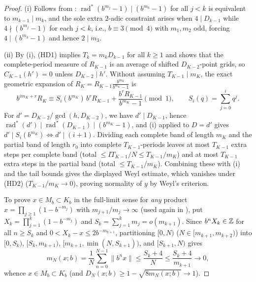 \documentclass[11pt]{article}
\newcommand{\dist}[1]{\lVert #1\rVert}
\DeclareMathOperator{\rad}{rad}
\begin{document}
\begin{proof}
(i) Follows from : $\rad^*(b^{m_j}-1)\mid(b^{m_k}-1)$ for all $j<k$ is equivalent to $m_{k-1}\mid m_k$, and the sole extra $2$-adic constraint arises when $4\mid D_{k-1}$ while $4\nmid(b^{m_j}-1)$ for each $j<k$, i.e., $b\equiv3\pmod4$ with $m_1,m_2$ odd, forcing $4\mid(b^{m_3}-1)$ and hence $2\mid m_3$.

(ii) By (i), \textup{(HD1)} implies $T_k=m_k D_{k-1}$ for all $k\ge1$ and shows that the complete-period measure of $R_{K-1}$ is an average of shifted $D_{K-2}$-point grids, so $\widehat C_{K-1}(h')=0$ unless $D_{K-2}\mid h'$. Without assuming $T_{K-1}\mid m_K$, the exact geometric expansion of $R_K=R_{K-1}\frac{b^{m_K}}{b^{m_K}-1}$ is
\begin{equation}\label{eq:exact-geom-band}
b^{im_K+r}R_K\equiv S_i(b^{m_K})\,b^r R_{K-1}+\frac{b^r R_{K-1}}{b^{m_K}-1}\pmod1,\qquad S_i(q)=\sum_{j=0}^i q^j.
\end{equation}
For $d'=D_{K-2}/\gcd(h,D_{K-2})$, we have $d'\mid D_{K-1}$, hence $\rad^*(d')\mid\rad^*(D_{K-1})\mid(b^{m_K}-1)$, and (i) applied to $D=d'$ gives $d'\mid S_i(b^{m_K})\iff d'\mid(i+1)$. Dividing each complete band of length $m_K$ and the partial band of length $r_0$ into complete $T_{K-1}$-periods leaves at most $T_{K-1}$ extra steps per complete band (total $\le IT_{K-1}/N\le T_{K-1}/m_K$) and at most $T_{K-1}$ extra steps in the partial band (total $\le T_{K-1}/m_K$). Combining these with (i) and the tail bounds gives the displayed Weyl estimate, which vanishes under \textup{(HD2)} ($T_{K-1}/m_K\to0$), proving normality of $y$ by Weyl's criterion.

To prove $x\in M_b\subset K_b$ in the full-limit sense for \emph{any} product $x=\prod_{j\ge1}(1-b^{-m_j})$ with $m_{j+1}/m_j\to\infty$ (used again in ), put $X_k=\prod_{j=1}^k(1-b^{-m_j})$ and $S_k=\sum_{j=1}^k m_j=o(m_{k+1})$. Since $b^n X_k\in\mathbb Z$ for all $n\ge S_k$ and $0<X_k-x\le 2b^{-m_{k+1}}$, partitioning $[0,N)$ ($N\in[m_{k+1},m_{k+2})$) into $[0,S_k)$, $[S_k,m_{k+1})$, $[m_{k+1},\min(N,S_{k+1}))$, and $[S_{k+1},N)$ gives
\begin{equation}\label{eq:all-minus-Mb}
m_N(x;b)=\frac1N\sum_{n=0}^{N-1}\dist{b^nx}\le\frac{S_k+4}{N}\le\frac{S_k+4}{m_{k+1}}\longrightarrow0,
\end{equation}
whence $x\in M_b\subset K_b$ (and $D_N(x;b)\ge 1-\sqrt{8m_N(x;b)}\to1$).


\end{proof}
\end{document}
